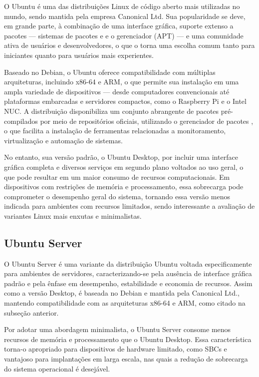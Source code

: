 O Ubuntu \citep{ubuntudsktp2025} é uma das distribuições Linux de código aberto mais utilizadas no mundo, sendo mantida pela empresa Canonical Ltd. Sua popularidade se deve, em grande parte, à combinação de uma interface gráfica, suporte extenso a pacotes --- sistemas de pacotes \textcolor{red}{} e \textcolor{red}{} e o gerenciador  (APT) ---  e uma comunidade ativa de usuários e desenvolvedores, o que o torna uma escolha comum tanto para iniciantes quanto para usuários mais experientes.

Baseado no Debian, o Ubuntu oferece compatibilidade com múltiplas arquiteturas, incluindo x86-64 e ARM, o que permite sua instalação em uma ampla variedade de dispositivos — desde computadores convencionais até plataformas embarcadas e servidores compactos, como o Raspberry Pi e o Intel NUC. A distribuição disponibiliza um conjunto abrangente de pacotes pré-compilados por meio de repositórios oficiais, utilizando o gerenciador de pacotes , o que facilita a instalação de ferramentas relacionadas a monitoramento, virtualização e automação de sistemas.

No entanto, sua versão padrão, o Ubuntu Desktop, por incluir uma interface gráfica completa e diversos serviços em segundo plano voltados ao uso geral, o que pode resultar em um maior consumo de recursos computacionais. Em dispositivos com restrições de memória e processamento, essa sobrecarga pode comprometer o desempenho geral do sistema, tornando essa versão menos indicada para ambientes com recursos limitados, sendo interessante a avaliação de variantes Linux mais enxutas e minimalistas.

\subsection{Ubuntu Server}
\label{subsection:UbuntuServer}

O Ubuntu Server \citep{ubuntusrvr2025} é uma variante da distribuição Ubuntu voltada especificamente para ambientes de servidores, caracterizando-se pela ausência de interface gráfica padrão e pela ênfase em desempenho, estabilidade e economia de recursos. Assim como a versão Desktop, é baseada no Debian e mantida pela Canonical Ltd., mantendo compatibilidade com as arquiteturas x86-64 e ARM, como citado na subseção anterior.

Por adotar uma abordagem minimalista, o Ubuntu Server consome menos recursos de memória e processamento que o Ubuntu Desktop. Essa característica torna-o apropriado para dispositivos de hardware limitado, como SBCs e vantajoso para implantações em larga escala, nas quais a redução de sobrecarga do sistema operacional é desejável.

